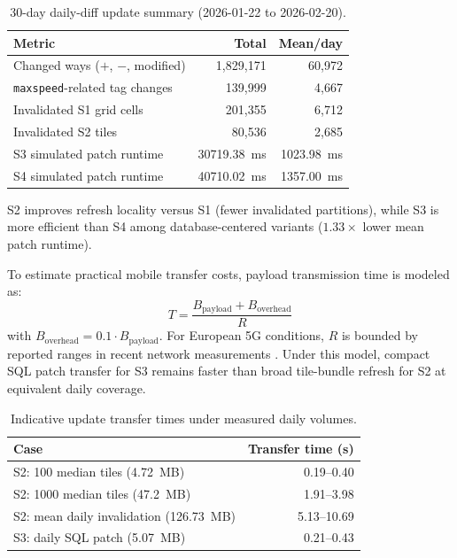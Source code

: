 \documentclass[conference]{IEEEtran}
\begin{document}
\begin{table}[!t]
\caption{30-day daily-diff update summary (2026-01-22 to 2026-02-20).}
\label{tab:update_summary}
\centering
\begin{tabular}{p{4.8cm}rr}
\toprule
Metric & Total & Mean/day \\
\midrule
Changed ways (\(+\), \(-\), modified) & 1{,}829{,}171 & 60{,}972 \\
\texttt{maxspeed}-related tag changes & 139{,}999 & 4{,}667 \\
Invalidated S1 grid cells & 201{,}355 & 6{,}712 \\
Invalidated S2 tiles & 80{,}536 & 2{,}685 \\
S3 simulated patch runtime & \SI{30719.38}{ms} & \SI{1023.98}{ms} \\
S4 simulated patch runtime & \SI{40710.02}{ms} & \SI{1357.00}{ms} \\
\bottomrule
\end{tabular}
\end{table}

S2 improves refresh locality versus S1 (fewer invalidated partitions), while S3 is more efficient than S4 among database-centered variants (\(1.33\times\) lower mean patch runtime).

To estimate practical mobile transfer costs, payload transmission time is modeled as:
\begin{equation}
T=\frac{B_{\text{payload}}+B_{\text{overhead}}}{R}
\end{equation}
with \(B_{\text{overhead}}=0.1 \cdot B_{\text{payload}}\). For European 5G conditions, \(R\) is bounded by reported ranges in recent network measurements \cite{opensignal_europe_5g_2024,eu_connectivity_impact_2026}. Under this model, compact SQL patch transfer for S3 remains faster than broad tile-bundle refresh for S2 at equivalent daily coverage.

\begin{table}[!t]
\caption{Indicative update transfer times under measured daily volumes.}
\label{tab:transfer}
\centering
\begin{tabular}{p{3.5cm}r}
\toprule
Case & Transfer time (s) \\
\midrule
S2: 100 median tiles (\SI{4.72}{MB}) & 0.19--0.40 \\
S2: 1000 median tiles (\SI{47.2}{MB}) & 1.91--3.98 \\
S2: mean daily invalidation (\SI{126.73}{MB}) & 5.13--10.69 \\
S3: daily SQL patch (\SI{5.07}{MB}) & 0.21--0.43 \\
\bottomrule
\end{tabular}
\end{table}
\end{document}
